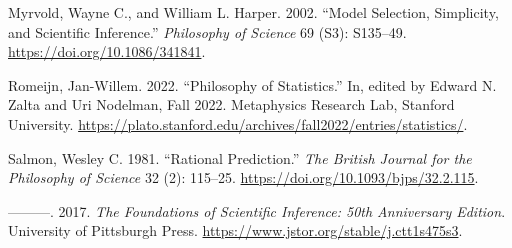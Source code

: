 \documentclass[
  letterpaper,
  DIV=11,
  numbers=noendperiod]{scrartcl}
\newlength{\cslhangindent}
\newenvironment{CSLReferences}[2] %
 {\begin{list}{}{%
  \setlength{\itemindent}{0pt}
  \setlength{\leftmargin}{0pt}
  \setlength{\parsep}{0pt}
  \ifodd #1
   \setlength{\leftmargin}{\cslhangindent}
   \setlength{\itemindent}{-1\cslhangindent}
  \fi
  \setlength{\itemsep}{#2\baselineskip}}}
 {\end{list}}
\theoremstyle{definition}
\theoremstyle{remark}
\begin{document}
\begin{CSLReferences}{1}{0}
Myrvold, Wayne C., and William L. Harper. 2002. {``Model Selection,
Simplicity, and Scientific Inference.''} \emph{Philosophy of Science} 69
(S3): S135--49. \url{https://doi.org/10.1086/341841}.

Romeijn, Jan-Willem. 2022. {``Philosophy of Statistics.''} In, edited by
Edward N. Zalta and Uri Nodelman, Fall 2022. Metaphysics Research Lab,
Stanford University.
\url{https://plato.stanford.edu/archives/fall2022/entries/statistics/}.

Salmon, Wesley C. 1981. {``Rational Prediction.''} \emph{The British
Journal for the Philosophy of Science} 32 (2): 115--25.
\url{https://doi.org/10.1093/bjps/32.2.115}.

---------. 2017. \emph{The Foundations of Scientific Inference: 50th
Anniversary Edition}. University of Pittsburgh Press.
\url{https://www.jstor.org/stable/j.ctt1s475s3}.

\end{CSLReferences}
\end{document}
